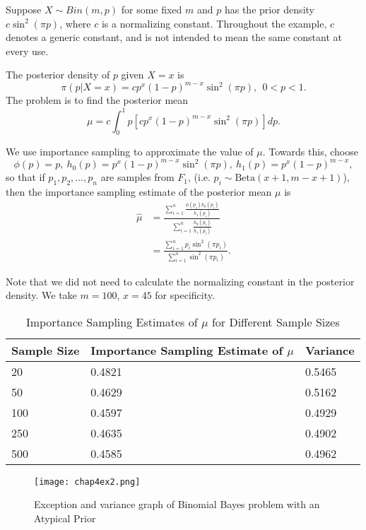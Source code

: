 \begin{example}
	\label{Binomial Bayes problem with an Atypical Prior}
	Suppose $X\sim Bin(m,p)$ for some fixed $m$ and $p$ has the prior density $c\sin^{2}(\pi p)$,
	where $c$ is a normalizing constant.
	Throughout the example, $c$ denotes a generic constant,
	and is not intended to mean the same constant at every use.

	The posterior density of $p$ given $X = x$ is
	\[
		\pi(p|X=x) = cp^{x}(1-p)^{m-x}\sin ^{2}(\pi p), \ \ 0<p<1.
	\]
	The problem is to find the posterior mean
	\[
		\mu = c \int_{0}^{1} p[cp^{x}(1-p)^{m-x}\sin ^{2}(\pi p)]dp.
	\]

	We use importance sampling to approximate the value of $\mu$. Towards this, choose
	\[
		\phi(p)=p, \ h_0(p) = p^{x} (1-p)^{m-x} \sin ^{2}(\pi p),\ h_1(p) = p^{x}(1-p)^{m-x},
	\]
    so that if $p_1,p_2,\ldots,p_n$ are samples from $F_1$, (i.e. $p_i\sim \text{Beta}(x+1, m-x+1)$),
	then the importance sampling estimate of the posterior mean $\mu$ is
	\begin{align*}
		\hat{\mu} & = \frac{\sum_{i=1}^{n}\frac{\phi(p_i)h_0(p_i)}{h_1(p_i)} }{\sum_{i=1}^{n}\frac{h_0(p_i)}{h_1(p_i)} } \\
		          & = \frac{\sum_{i=1}^{n}p_i\sin ^{2}(\pi p_i) }{\sum_{i=1}^{n} \sin ^{2}(\pi p_i) }.
	\end{align*}

	Note that we did not need to calculate the normalizing constant in the posterior density.
	We take $m=100$, $x=45$ for specificity.
	\begin{table}[H]
		\centering
		\begin{tabular}{l p{4.5cm} p{2cm}}
			\hline
			Sample Size & Importance Sampling Estimate of $\mu$ & Variance \\
			\hline
			20          & 0.4821                                & 0.5465   \\
			50          & 0.4629                                & 0.5162   \\
			100         & 0.4597                                & 0.4929   \\
			250         & 0.4635                                & 0.4902   \\
			500         & 0.4585                                & 0.4962   \\
			\hline
		\end{tabular}
		\caption{Importance Sampling Estimates of $\mu$ for Different Sample Sizes}
		\label{tab:importance-sampling-mu}
	\end{table}
    \begin{figure}[H]
        \centering
        \texttt{[image: chap4ex2.png]}
        \caption{Exception and variance graph of Binomial Bayes problem with an Atypical Prior}
    \end{figure}
\end{example}

